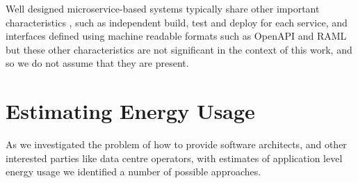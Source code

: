 Well designed microservice-based systems typically share other important characteristics \cite{newman2015_microservices}, such as independent build, test and deploy for each service, and interfaces defined using machine readable formats such as OpenAPI \cite{openapi2018} and RAML \cite{raml2018} but these other characteristics are not significant in the context of this work, and so we do not assume that they are present.

\section{Estimating Energy Usage}

As we investigated the problem of how to provide software architects, and other interested parties like data centre operators, with estimates of application level energy usage we identified a number of possible approaches.  

